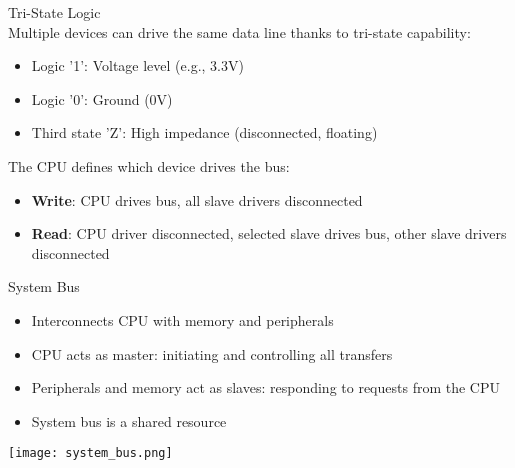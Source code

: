 \begin{definition}{Tri-State Logic}\\
Multiple devices can drive the same data line thanks to tri-state capability:
\begin{itemize}
    \item Logic '1': Voltage level (e.g., 3.3V)
    \item Logic '0': Ground (0V)
    \item Third state 'Z': High impedance (disconnected, floating)
\end{itemize}
The CPU defines which device drives the bus:
\begin{itemize}
    \item \textbf{Write}: CPU drives bus, all slave drivers disconnected
    \item \textbf{Read}: CPU driver disconnected, selected slave drives bus, other slave drivers disconnected
\end{itemize}
\end{definition}

\begin{definition}{System Bus}
    \begin{itemize}
        \item Interconnects CPU with memory and peripherals
        \item CPU acts as master: initiating and controlling all transfers
        \item Peripherals and memory act as slaves: responding to requests from the CPU
        \item System bus is a shared resource
    \end{itemize}
    \texttt{[image: system\_bus.png]}
\end{definition}

